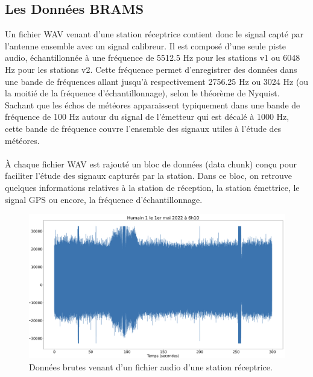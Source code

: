 \documentclass[11pt]{article}
\begin{document}


\subsection{Les Données BRAMS}

Un fichier WAV venant d'une station réceptrice contient donc le signal capté par l'antenne ensemble avec un signal calibreur.
Il est composé d'une seule piste audio, échantillonnée à une fréquence de 5512.5 Hz pour les stations v1 ou 6048 Hz pour les stations v2.
Cette fréquence permet d'enregistrer des données dans une bande de fréquences allant jusqu'à respectivement 2756.25 Hz ou 3024 Hz (ou la moitié de la fréquence d'échantillonnage), selon le théorème de Nyquist.
Sachant que les échos de météores apparaissent typiquement dans une bande de fréquence de 100 Hz autour du signal de l'émetteur qui est décalé à 1000 Hz, cette bande de fréquence couvre l'ensemble des signaux utiles à l'étude des météores.\\
\\
À chaque fichier WAV est rajouté un bloc de données (data chunk) conçu pour faciliter l'étude des signaux capturés par la station.
Dans ce bloc, on retrouve quelques informations relatives à la station de réception, la station émettrice, le signal GPS ou encore, la fréquence d'échantillonnage.

\begin{figure}[h]
    \begin{center}
        \includegraphics[scale=0.155]{wav_brut.png}
        \caption{Données brutes venant d'un fichier audio d'une station réceptrice.}
        \label{fig:wav_brut}
    \end{center}
\end{figure}
\end{document}
